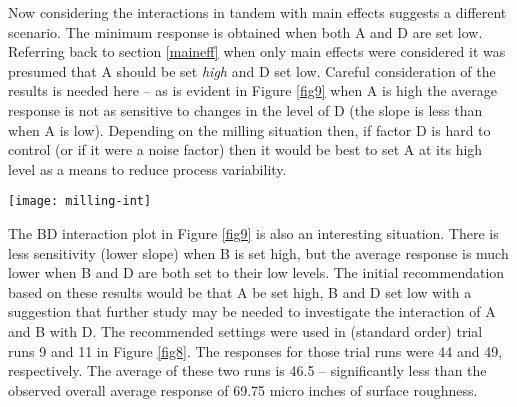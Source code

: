 Now considering the interactions in tandem with main effects suggests a different scenario.  The minimum response is obtained when both A and D are set low. Referring back to section \ref{maineff} when only main effects were considered it was presumed that A should be set \textit{high} and D set low.  Careful consideration of the results is needed here -- as is evident in Figure \ref{fig9} when A is high the average response is not as sensitive to changes in the level of D (the slope is less than when A is low).  Depending on the milling situation then, if factor D is hard to control (or if it were a noise factor) then it would be best to set A at its high level as a means to reduce process variability.

\begin{sidewaysfigure}[h]\caption{Milling Experiment Interaction Plots}\label{fig9}
\begin{center}
\texttt{[image: milling-int]}
\end{center}
\end{sidewaysfigure}

The BD interaction plot in Figure \ref{fig9} is also an interesting situation. There is less sensitivity (lower slope) when B is set high, but the average response is much lower when B and D are both set to their low levels. The initial recommendation based on these results would be that A be set high, B and D set low with a suggestion that further study may be needed to investigate the interaction of A and B with D. The recommended settings were used in (standard order) trial runs 9 and 11 in Figure \ref{fig8}. The responses for those trial runs were 44 and 49, respectively.  The average of these two runs is 46.5 -- significantly less than the observed overall average response of 69.75 micro inches of surface roughness.